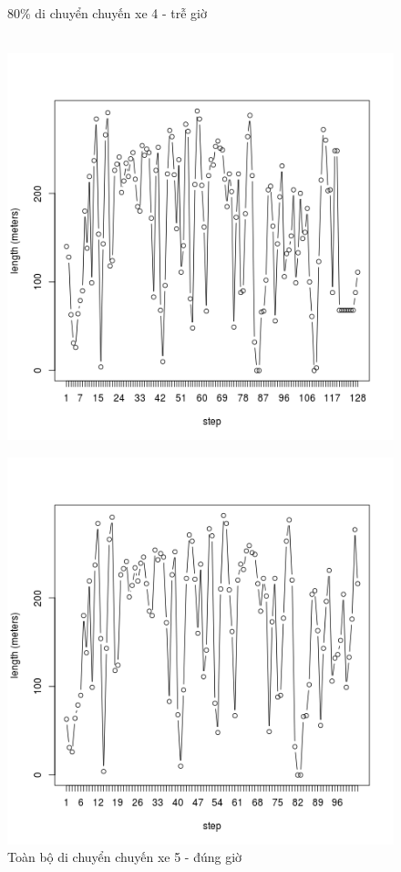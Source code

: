 \documentclass[a4paper, 13pt]{report}
\begin{document}
\begin{figure}[!htb]
  \caption*{80\% di chuyển chuyến xe 4 - trễ giờ}
\endminipage\\
  \includegraphics[width=\linewidth]{test_100_5}
  \caption*{Toàn bộ di chuyển chuyến xe 5 - đúng giờ}
\endminipage
{}
  \includegraphics[width=\linewidth]{test_80_5}

\end{figure}
\end{document}
